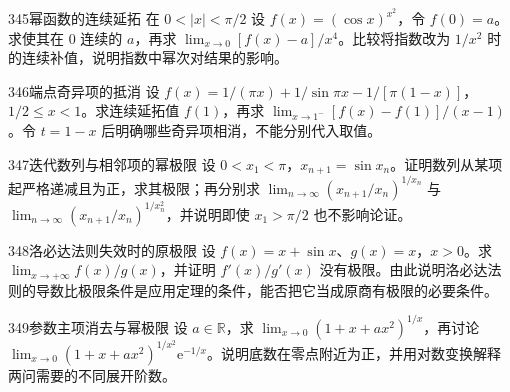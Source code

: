 \begin{exercise}{345}{幂函数的连续延拓}
在 $0<|x|<\pi/2$ 设 $f(x)=(\cos x)^{x^2}$，令 $f(0)=a$。求使其在 $0$ 连续的 $a$，再求 $\lim_{x\to0}[f(x)-a]/x^4$。比较将指数改为 $1/x^2$ 时的连续补值，说明指数中幂次对结果的影响。
\end{exercise}
\begin{exercise}{346}{端点奇异项的抵消}
设 $f(x)=1/(\pi x)+1/\sin\pi x-1/[\pi(1-x)]$，$1/2\le x<1$。求连续延拓值 $f(1)$，再求 $\lim_{x\to1^-}[f(x)-f(1)]/(x-1)$。令 $t=1-x$ 后明确哪些奇异项相消，不能分别代入取值。
\end{exercise}
\begin{exercise}{347}{迭代数列与相邻项的幂极限}
设 $0<x_1<\pi$，$x_{n+1}=\sin x_n$。证明数列从某项起严格递减且为正，求其极限；再分别求 $\lim_{n\to\infty}(x_{n+1}/x_n)^{1/x_n}$ 与 $\lim_{n\to\infty}(x_{n+1}/x_n)^{1/x_n^2}$，并说明即使 $x_1>\pi/2$ 也不影响论证。
\end{exercise}
\begin{exercise}{348}{洛必达法则失效时的原极限}
设 $f(x)=x+\sin x$、$g(x)=x$，$x>0$。求 $\lim_{x\to+\infty}f(x)/g(x)$，并证明 $f'(x)/g'(x)$ 没有极限。由此说明洛必达法则的导数比极限条件是应用定理的条件，能否把它当成原商有极限的必要条件。
\end{exercise}
\begin{exercise}{349}{参数主项消去与幂极限}
设 $a\in\mathbb R$，求 $\lim_{x\to0}(1+x+ax^2)^{1/x}$，再讨论 $\lim_{x\to0}(1+x+ax^2)^{1/x^2}\mathrm e^{-1/x}$。说明底数在零点附近为正，并用对数变换解释两问需要的不同展开阶数。
\end{exercise}
